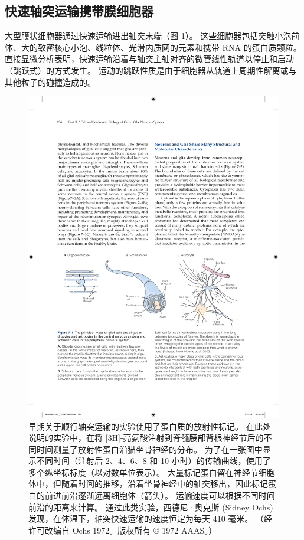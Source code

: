 \subsection{快速轴突运输携带膜细胞器}

大型膜状细胞器通过快速运输进出轴突末端（图 \ref{fig:7_11}）。 
这些细胞器包括突触小泡前体、大的致密核心小泡、线粒体、光滑内质网的元素和携带 RNA 的蛋白质颗粒。 
直接显微分析表明，快速运输沿着与轴突主轴对齐的微管线性轨道以停止和启动（跳跃式）的方式发生。 
运动的跳跃性质是由于细胞器从轨道上周期性解离或与其他粒子的碰撞造成的。

\begin{figure}[htbp]
	\centering
	\includegraphics[width=1.0\linewidth]{chap07/fig_7_1}
	\caption{早期关于顺行轴突运输的实验使用了蛋白质的放射性标记。 在此处说明的实验中，在将 [3H]-亮氨酸注射到脊髓腰部背根神经节后的不同时间测量了放射性蛋白沿猫坐骨神经的分布。 为了在一张图中显示不同时间（注射后 2、4、6、8 和 10 小时）的传输曲线，使用了多个纵坐标标度（以对数单位表示）。 大量标记蛋白留在神经节细胞体中，但随着时间的推移，沿着坐骨神经中的轴突移出，因此标记蛋白的前进前沿逐渐远离细胞体（箭头）。 运输速度可以根据不同时间前沿的距离来计算。 通过此类实验，西德尼·奥克斯 (Sidney Ochs) 发现，在体温下，轴突快速运输的速度恒定为每天 410 毫米。 （经许可改编自 Ochs 1972。版权所有 © 1972 AAAS。）}
	\label{fig:7_11}
\end{figure}


